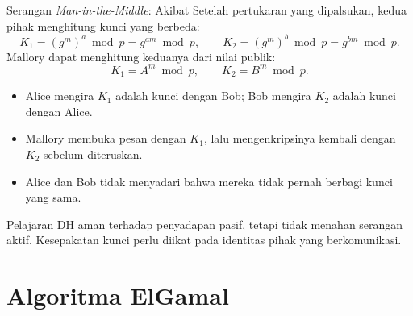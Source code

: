 \documentclass[aspectratio=169,11pt]{beamer}
\begin{document}
\begin{frame}{Serangan \textit{Man-in-the-Middle}: Akibat}
    \footnotesize
    Setelah pertukaran yang dipalsukan, kedua pihak menghitung kunci yang
    berbeda:
    \[
        K_1 = (g^{m})^{a} \bmod p = g^{am} \bmod p,
        \qquad
        K_2 = (g^{m})^{b} \bmod p = g^{bm} \bmod p .
    \]
    Mallory dapat menghitung keduanya dari nilai publik:
    \[
        K_1 = A^{m} \bmod p, \qquad K_2 = B^{m} \bmod p .
    \]
    \begin{itemize}
        \item Alice mengira $K_1$ adalah kunci dengan Bob; Bob mengira
              $K_2$ adalah kunci dengan Alice.
        \item Mallory membuka pesan dengan $K_1$, lalu mengenkripsinya
              kembali dengan $K_2$ sebelum diteruskan.
        \item Alice dan Bob tidak menyadari bahwa mereka tidak pernah
              berbagi kunci yang sama.
    \end{itemize}
    \begin{alertblock}{Pelajaran}
        \footnotesize
        DH aman terhadap penyadapan pasif, tetapi tidak menahan serangan
        aktif. Kesepakatan kunci perlu diikat pada identitas pihak yang
        berkomunikasi.
    \end{alertblock}
\end{frame}

\section{Algoritma ElGamal}
\end{document}
